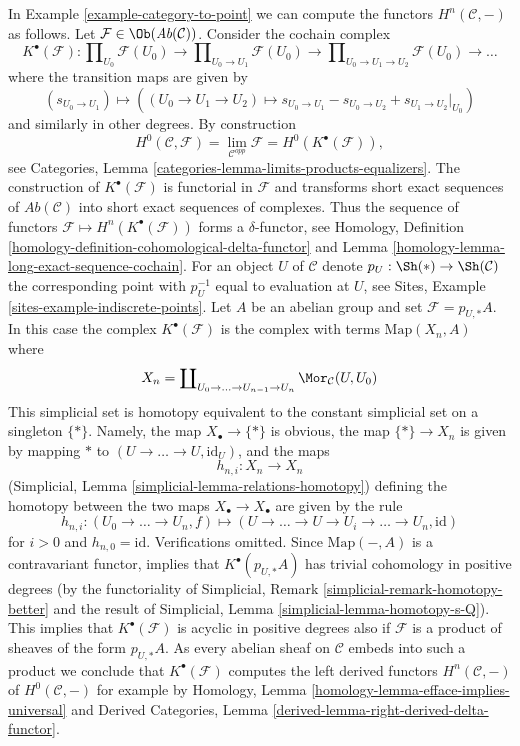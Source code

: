 \begin{example}
\label{example-right-derived-limits}
In Example \ref{example-category-to-point} we can compute
the functors $H^n(\mathcal{C}, -)$ as follows. Let
$\mathcal{F} \in \Ob(\textit{Ab}(\mathcal{C}))$.
Consider the cochain complex
$$
K^\bullet(\mathcal{F}) :
\prod\nolimits_{U_0} \mathcal{F}(U_0)
\to
\prod\nolimits_{U_0 \to U_1} \mathcal{F}(U_0)
\to
\prod\nolimits_{U_0 \to U_1 \to U_2} \mathcal{F}(U_0)
\to \ldots
$$
where the transition maps are given by
$$
(s_{U_0 \to U_1})
\longmapsto
((U_0 \to U_1 \to U_2) \mapsto s_{U_0 \to U_1} - s_{U_0 \to U_2}
+ s_{U_1 \to U_2}|_{U_0})
$$
and similarly in other degrees. By construction
$$
H^0(\mathcal{C}, \mathcal{F}) =
\lim_{\mathcal{C}^{opp}} \mathcal{F} =
H^0(K^\bullet(\mathcal{F})),
$$
see Categories, Lemma \ref{categories-lemma-limits-products-equalizers}.
The construction of $K^\bullet(\mathcal{F})$ is functorial in $\mathcal{F}$
and transforms short exact sequences of $\textit{Ab}(\mathcal{C})$ into
short exact sequences of complexes. Thus the sequence of functors
$\mathcal{F} \mapsto H^n(K^\bullet(\mathcal{F}))$ forms a $\delta$-functor, see
Homology, Definition \ref{homology-definition-cohomological-delta-functor} and
Lemma \ref{homology-lemma-long-exact-sequence-cochain}.
For an object $U$ of $\mathcal{C}$ denote $p_U : \Sh(*) \to \Sh(\mathcal{C})$
the corresponding point with $p_U^{-1}$ equal to evaluation at $U$, see
Sites, Example \ref{sites-example-indiscrete-points}.
Let $A$ be an abelian group and set $\mathcal{F} = p_{U, *}A$. In this case
the complex $K^\bullet(\mathcal{F})$ is the complex with terms
$\text{Map}(X_n, A)$ where
$$
X_n = \coprod\nolimits_{U_0 \to \ldots \to U_{n - 1} \to U_n}
\Mor_\mathcal{C}(U, U_0)
$$
This simplicial set is homotopy equivalent to the constant simplicial
set on a singleton $\{*\}$. Namely, the map $X_\bullet \to \{*\}$
is obvious, the map $\{*\} \to X_n$ is given
by mapping $*$ to $(U \to \ldots \to U, \text{id}_U)$, and the
maps
$$
h_{n, i} : X_n \longrightarrow X_n
$$
(Simplicial, Lemma \ref{simplicial-lemma-relations-homotopy})
defining the homotopy between the two maps $X_\bullet \to X_\bullet$
are given by the rule
$$
h_{n, i} :
(U_0 \to \ldots \to U_n, f)
\longmapsto
(U \to \ldots \to U \to U_i \to \ldots \to U_n, \text{id})
$$
for $i > 0$ and $h_{n, 0} = \text{id}$. Verifications omitted.
Since $\text{Map}(-, A)$ is a contravariant functor, implies that
$K^\bullet(p_{U, *}A)$ has trivial cohomology in positive degrees
(by the functoriality of
Simplicial, Remark \ref{simplicial-remark-homotopy-better}
and the result of
Simplicial, Lemma \ref{simplicial-lemma-homotopy-s-Q}).
This implies that $K^\bullet(\mathcal{F})$ is acyclic in positive
degrees also if $\mathcal{F}$ is a product of sheaves of the form
$p_{U, *}A$. As every abelian sheaf on $\mathcal{C}$ embeds
into such a product we conclude that $K^\bullet(\mathcal{F})$
computes the left derived functors
$H^n(\mathcal{C}, -)$ of $H^0(\mathcal{C}, -)$
for example by
Homology, Lemma \ref{homology-lemma-efface-implies-universal}
and
Derived Categories, Lemma \ref{derived-lemma-right-derived-delta-functor}.
\end{example}

